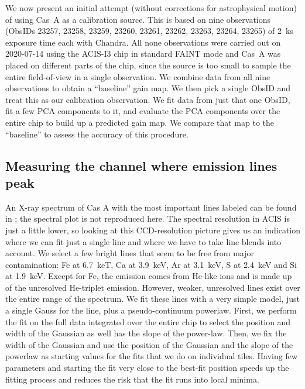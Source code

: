 \documentclass[]{spie}  %
\begin{document}
We now present an initial attempt (without corrections for astrophysical motion) of using Cas~A as a calibration source.
This is based on nine observations (ObsIDs 23257, 23258, 23259, 23260, 23261, 23262, 23263, 23264, 23265) of 2~ks exposure time each with Chandra. All none observations were carried out on 2020-07-14 using the ACIS-I3 chip in standard FAINT mode and Cas~A was placed on different parts of the chip, since the source is too small to sample the entire field-of-view in a single observation. We combine data from all nine observations to obtain a ``baseline'' gain map. We then pick a single ObsID and treat this as our calibration observation. We fit data from just that one ObsID, fit a few PCA components to it, and evaluate the PCA components over the entire chip to build up a predicted gain map. We compare that map to the ``baseline'' to assess the accuracy of this procedure.

\subsection{Measuring the channel where emission lines peak}
An X-ray spectrum of Cas A with the most important lines labeled can be found in ; the spectral plot is not reproduced here. The spectral resolution in ACIS is just a little lower, so looking at this CCD-resolution picture gives us an indication where we can fit just a single line and where we have to take line blends into account. We select a few bright lines that seem to be free from major contamination: Fe at 6.7~keT, Ca at 3.9~keV, Ar at 3.1~keV, S at 2.4~keV and Si at 1.9~keV. Except for Fe, the emission comes from He-like ions and is made up of the unresolved He-triplet emission. However, weaker, unresolved lines exist over the entire range of the spectrum. We fit these lines with a very simple model, just a single Gauss for the line, plus a pseudo-continuum powerlaw. First, we perform the fit on the full data integrated over the entire chip to select the position and width of the Gaussian as well has the slope of the power-law. Then, we fix the width of the Gaussian and use the position of the Gaussian and the slope of the powerlaw as starting values for the fits that we do on individual tiles. Having few parameters and starting the fit very close to the best-fit position speeds up the fitting process and reduces the risk that the fit runs into local minima.
\end{document}

